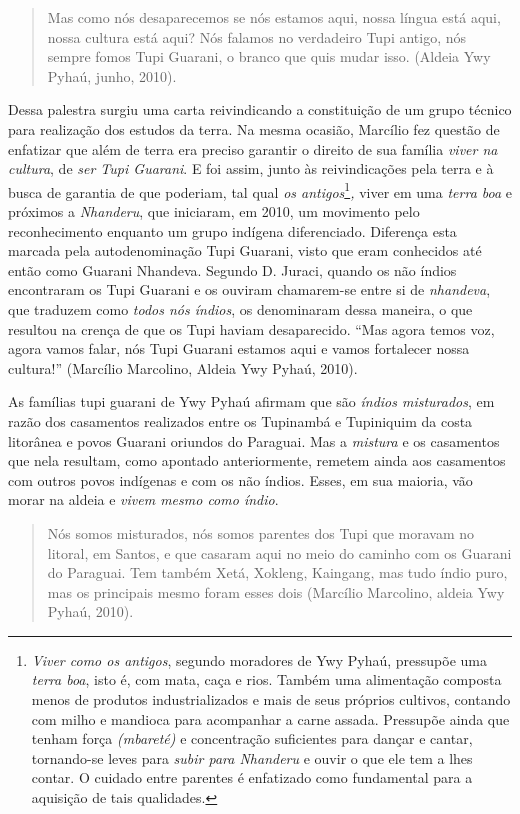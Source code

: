 \begin{quote}
Mas como nós desaparecemos se nós estamos aqui, nossa língua está aqui,
nossa cultura está aqui? Nós falamos no verdadeiro Tupi antigo, nós
sempre fomos Tupi Guarani, o branco que quis mudar isso. (Aldeia Ywy
Pyhaú, junho, 2010).
\end{quote}

Dessa palestra surgiu uma carta reivindicando a constituição de um grupo
técnico para realização dos estudos da terra. Na mesma ocasião, Marcílio
fez questão de enfatizar que além de terra era preciso garantir o
direito de sua família \emph{viver na cultura}, de \emph{ser Tupi
Guarani}. E foi assim, junto às reivindicações pela terra e à busca de
garantia de que poderiam, tal qual \emph{os antigos}\footnote{\emph{Viver
  como os antigos}, segundo moradores de Ywy Pyhaú, pressupõe uma
  \emph{terra boa}, isto é, com mata, caça e rios. Também uma
  alimentação composta menos de produtos industrializados e mais de seus
  próprios cultivos, contando com milho e mandioca para acompanhar a
  carne assada. Pressupõe ainda que tenham força \emph{(mbareté)} e
  concentração suficientes para dançar e cantar, tornando-se leves para
  \emph{subir para Nhanderu} e ouvir o que ele tem a lhes contar. O
  cuidado entre parentes é enfatizado como fundamental para a aquisição
  de tais qualidades.}\emph{,} viver em uma \emph{terra boa} e próximos
a \emph{Nhanderu}, que iniciaram, em 2010, um movimento pelo
reconhecimento enquanto um grupo indígena diferenciado. Diferença esta
marcada pela autodenominação Tupi Guarani, visto que eram conhecidos até
então como Guarani Nhandeva. Segundo D. Juraci, quando os não índios
encontraram os Tupi Guarani e os ouviram chamarem-se entre si de
\emph{nhandeva}, que traduzem como \emph{todos nós índios}, os
denominaram dessa maneira, o que resultou na crença de que os Tupi
haviam desaparecido. ``Mas agora temos voz, agora vamos falar, nós Tupi
Guarani estamos aqui e vamos fortalecer nossa cultura!'' (Marcílio
Marcolino, Aldeia Ywy Pyhaú, 2010).

As famílias tupi guarani de Ywy Pyhaú afirmam que são \emph{índios
misturados}, em razão dos casamentos realizados entre os Tupinambá e
Tupiniquim da costa litorânea e povos Guarani oriundos do Paraguai. Mas
a \emph{mistura} e os casamentos que nela resultam, como apontado
anteriormente, remetem ainda aos casamentos com outros povos indígenas e
com os não índios. Esses, em sua maioria, vão morar na aldeia e
\emph{vivem mesmo como índio}.

\begin{quote}
Nós somos misturados, nós somos parentes dos Tupi que moravam no
litoral, em Santos, e que casaram aqui no meio do caminho com os Guarani
do Paraguai. Tem também Xetá, Xokleng, Kaingang, mas tudo índio puro,
mas os principais mesmo foram esses dois (Marcílio Marcolino, aldeia Ywy
Pyhaú, 2010).
\end{quote}

